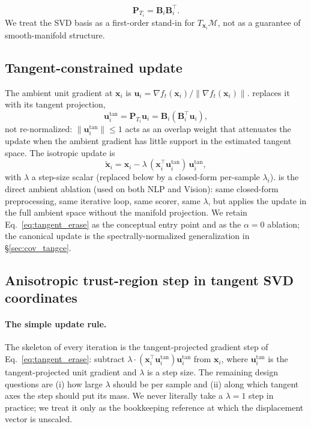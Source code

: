 \begin{equation}
\label{eq:tangent_proj}
\mathbf{P}_{T_i} = \mathbf{B}_i \mathbf{B}_i^\top.
\end{equation}
We treat the SVD basis as a first-order stand-in for $T_{\mathbf{x}_i}\mathcal{M}$, not as a guarantee of smooth-manifold structure.

\subsection{Tangent-constrained update}

The ambient unit gradient at $\mathbf{x}_i$ is $\mathbf{u}_i = \nabla f_t(\mathbf{x}_i) / \|\nabla f_t(\mathbf{x}_i)\|$. \TanGCE{} replaces it with its tangent projection,
\begin{equation}
\label{eq:tangent_direction}
\mathbf{u}_i^{\mathrm{tan}} = \mathbf{P}_{T_i} \mathbf{u}_i = \mathbf{B}_i (\mathbf{B}_i^\top \mathbf{u}_i),
\end{equation}
not re-normalized: $\|\mathbf{u}_i^{\mathrm{tan}}\| \le 1$ acts as an overlap weight that attenuates the update when the ambient gradient has little support in the estimated tangent space. The isotropic update is
\begin{equation}
\label{eq:tangent_erase}
\tilde{\mathbf{x}}_i = \mathbf{x}_i - \lambda \, (\mathbf{x}_i^\top \mathbf{u}_i^{\mathrm{tan}}) \, \mathbf{u}_i^{\mathrm{tan}},
\end{equation}
with $\lambda$ a step-size scalar (replaced below by a closed-form per-sample $\lambda_i$). \AmbGCEpp{} is the direct ambient ablation (used on both NLP and Vision): same closed-form preprocessing, same iterative loop, same scorer, same $\lambda$, but applies the update in the full ambient space without the manifold projection. We retain Eq.~\ref{eq:tangent_erase} as the conceptual entry point and as the $\alpha = 0$ ablation; the canonical \TanGCE{} update is the spectrally-normalized generalization in §\ref{sec:cov_tangce}.

\subsection{Anisotropic trust-region step in tangent SVD coordinates}
\label{sec:closed_form_lambda}
\label{sec:cov_tangce}

\paragraph{The simple update rule.}
The skeleton of every iteration is the tangent-projected gradient step of Eq.~\ref{eq:tangent_erase}: subtract $\lambda \cdot (\mathbf{x}_i^\top \mathbf{u}_i^{\mathrm{tan}}) \mathbf{u}_i^{\mathrm{tan}}$ from $\mathbf{x}_i$, where $\mathbf{u}_i^{\mathrm{tan}}$ is the tangent-projected unit gradient and $\lambda$ is a step size. The remaining design questions are (i) how large $\lambda$ should be per sample and (ii) along which tangent axes the step should put its mass. We never literally take a $\lambda{=}1$ step in practice; we treat it only as the bookkeeping reference at which the displacement vector is unscaled.

